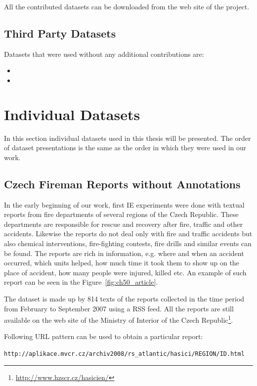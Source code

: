 All the contributed datasets can be downloaded from the web site of the project. 
\subsection{Third Party Datasets}

Datasets that were used without any additional contributions are:

\begin{itemize}
	\item {}
	\item {}
\end{itemize}


\section{Individual Datasets}
In this section individual datasets used in this thesis will be presented. The order of dataset presentations is the same as the order in which they were used in our work.

\subsection{Czech Fireman Reports without Annotations} \label{sec:ch40_fireman_without}
In the early beginning of our work, first IE experiments were done with textual reports from fire departments of several regions of the Czech Republic. These departments are responsible for rescue and recovery after fire, traffic and other accidents. Likewise the reports do not deal only with fire and traffic accidents but also chemical interventions, fire-fighting contests, fire drills and similar events can be found. The reports are rich in information, e.g. where and when an accident occurred, which units helped, how much time it took them to show up on the place of accident, how many people were injured, killed etc. An example of such report can be seen in the Figure~\ref{fig:ch50_article}.

The dataset is made up by 814 texts of the reports collected in the time period from February to September 2007 using a RSS feed. All the reports are still available on the web site of the Ministry of Interior of the Czech Republic\footnote{\url{http://www.hzscr.cz/hasicien/}}. 

Following URL pattern can be used to obtain a particular report:


\begin{center}
\verb+http://aplikace.mvcr.cz/archiv2008/rs_atlantic/hasici/REGION/ID.html+
\end{center}

